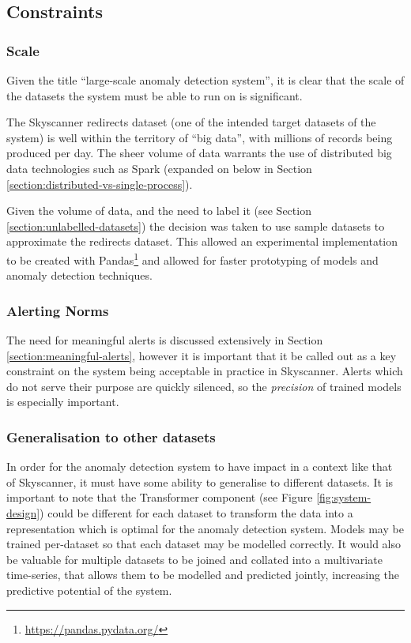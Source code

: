 \documentclass{mpaper}
\begin{document}
\subsection{Constraints}

\subsubsection{Scale}

Given the title ``large-scale anomaly detection system'', it is clear that the scale of the datasets the system must be able to run on is significant.

The Skyscanner redirects dataset (one of the intended target datasets of the system) is well within the territory of ``big data'', with millions of records being produced per day. The sheer volume of data warrants the use of distributed big data technologies such as Spark (expanded on below in Section \ref{section:distributed-vs-single-process}).

Given the volume of data, and the need to label it (see Section \ref{section:unlabelled-datasets}) the decision was taken to use sample datasets to approximate the redirects dataset. This allowed an experimental implementation to be created with Pandas\footnote{\url{https://pandas.pydata.org/}} and allowed for faster prototyping of models and anomaly detection techniques.

\subsubsection{Alerting Norms}

The need for meaningful alerts is discussed extensively in Section \ref{section:meaningful-alerts}, however it is important that it be called out as a key constraint on the system being acceptable in practice in Skyscanner. Alerts which do not serve their purpose are quickly silenced, so the \textit{precision} of trained models is especially important.

\subsubsection{Generalisation to other datasets}

In order for the anomaly detection system to have impact in a context like that of Skyscanner, it must have some ability to generalise to different datasets. It is important to note that the Transformer component (see Figure \ref{fig:system-design}) could be different for each dataset to transform the data into a representation which is optimal for the anomaly detection system. Models may be trained per-dataset so that each dataset may be modelled correctly. It would also be valuable for multiple datasets to be joined and collated into a multivariate time-series, that allows them to be modelled and predicted jointly, increasing the predictive potential of the system.
\end{document}
